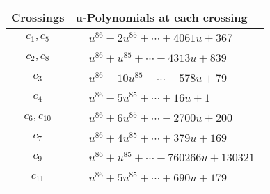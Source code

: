 \documentclass[1p]{elsarticle_modified}
\theoremstyle{definition}
\begin{document}
\begin{tabular}{m{50pt}|m{274pt}}
Crossings & \hspace{64pt}u-Polynomials at each crossing \\
\hline $$\begin{aligned}c_{1},c_{5}\end{aligned}$$&$\begin{aligned}
&u^{86}-2 u^{85}+\cdots+4061 u+367
\end{aligned}$\\
\hline $$\begin{aligned}c_{2},c_{8}\end{aligned}$$&$\begin{aligned}
&u^{86}+u^{85}+\cdots+4313 u+839
\end{aligned}$\\
\hline $$\begin{aligned}c_{3}\end{aligned}$$&$\begin{aligned}
&u^{86}-10 u^{85}+\cdots-578 u+79
\end{aligned}$\\
\hline $$\begin{aligned}c_{4}\end{aligned}$$&$\begin{aligned}
&u^{86}-5 u^{85}+\cdots+16 u+1
\end{aligned}$\\
\hline $$\begin{aligned}c_{6},c_{10}\end{aligned}$$&$\begin{aligned}
&u^{86}+6 u^{85}+\cdots-2700 u+200
\end{aligned}$\\
\hline $$\begin{aligned}c_{7}\end{aligned}$$&$\begin{aligned}
&u^{86}+4 u^{85}+\cdots+379 u+169
\end{aligned}$\\
\hline $$\begin{aligned}c_{9}\end{aligned}$$&$\begin{aligned}
&u^{86}+u^{85}+\cdots+760266 u+130321
\end{aligned}$\\
\hline $$\begin{aligned}c_{11}\end{aligned}$$&$\begin{aligned}
&u^{86}+5 u^{85}+\cdots+690 u+179
\end{aligned}$\\
\hline
\end{tabular}\\~\\
\end{document}
